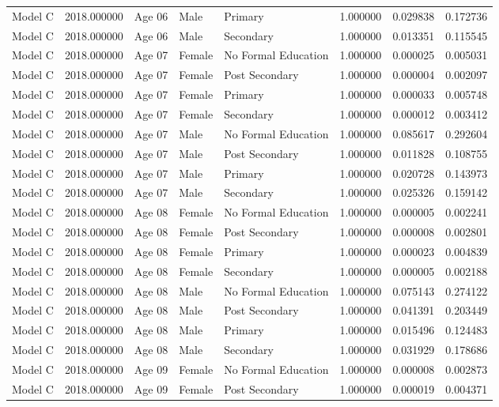 \begin{table}[ht]
\begin{tabular}{lrlllrrr}
Model C & 2018.000000 & Age 06 & Male & Primary & 1.000000 & 0.029838 & 0.172736 \\
Model C & 2018.000000 & Age 06 & Male & Secondary & 1.000000 & 0.013351 & 0.115545 \\
Model C & 2018.000000 & Age 07 & Female & No Formal Education & 1.000000 & 0.000025 & 0.005031 \\
Model C & 2018.000000 & Age 07 & Female & Post Secondary & 1.000000 & 0.000004 & 0.002097 \\
Model C & 2018.000000 & Age 07 & Female & Primary & 1.000000 & 0.000033 & 0.005748 \\
Model C & 2018.000000 & Age 07 & Female & Secondary & 1.000000 & 0.000012 & 0.003412 \\
Model C & 2018.000000 & Age 07 & Male & No Formal Education & 1.000000 & 0.085617 & 0.292604 \\
Model C & 2018.000000 & Age 07 & Male & Post Secondary & 1.000000 & 0.011828 & 0.108755 \\
Model C & 2018.000000 & Age 07 & Male & Primary & 1.000000 & 0.020728 & 0.143973 \\
Model C & 2018.000000 & Age 07 & Male & Secondary & 1.000000 & 0.025326 & 0.159142 \\
Model C & 2018.000000 & Age 08 & Female & No Formal Education & 1.000000 & 0.000005 & 0.002241 \\
Model C & 2018.000000 & Age 08 & Female & Post Secondary & 1.000000 & 0.000008 & 0.002801 \\
Model C & 2018.000000 & Age 08 & Female & Primary & 1.000000 & 0.000023 & 0.004839 \\
Model C & 2018.000000 & Age 08 & Female & Secondary & 1.000000 & 0.000005 & 0.002188 \\
Model C & 2018.000000 & Age 08 & Male & No Formal Education & 1.000000 & 0.075143 & 0.274122 \\
Model C & 2018.000000 & Age 08 & Male & Post Secondary & 1.000000 & 0.041391 & 0.203449 \\
Model C & 2018.000000 & Age 08 & Male & Primary & 1.000000 & 0.015496 & 0.124483 \\
Model C & 2018.000000 & Age 08 & Male & Secondary & 1.000000 & 0.031929 & 0.178686 \\
Model C & 2018.000000 & Age 09 & Female & No Formal Education & 1.000000 & 0.000008 & 0.002873 \\
Model C & 2018.000000 & Age 09 & Female & Post Secondary & 1.000000 & 0.000019 & 0.004371 \\

\end{tabular}
\end{table}
